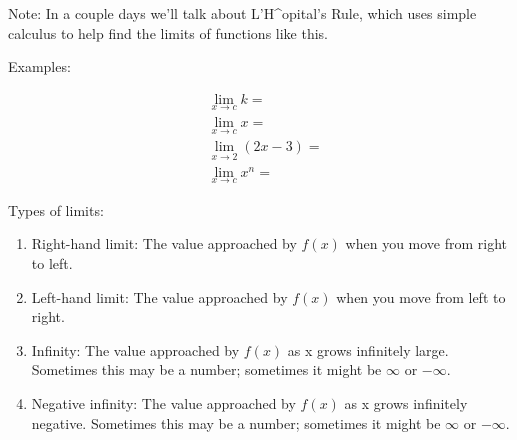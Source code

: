 \documentclass[]{book}
\providecommand{\tightlist}{%
  \setlength{\itemsep}{0pt}\setlength{\parskip}{0pt}}
\theoremstyle{definition}
\theoremstyle{definition}
\theoremstyle{definition}
\theoremstyle{remark}
\begin{document}
Note: In a couple days we'll talk about L'H\^{}opital's Rule, which uses
simple calculus to help find the limits of functions like this.

Examples:

\begin{align*}
& \lim_{x \to c} k = \\
& \lim_{x \to c} x = \\
& \lim_{x\to 2} (2x-3) =\\
& \lim_{x \to c} x^n = 
\end{align*}

Types of limits:

\begin{enumerate}
\def\labelenumi{\arabic{enumi}.}
\tightlist
\item
  Right-hand limit: The value approached by \(f(x)\) when you move from
  right to left.

\item
  Left-hand limit: The value approached by \(f(x)\) when you move from
  left to right.
\item
  Infinity: The value approached by \(f(x)\) as x grows infinitely
  large. Sometimes this may be a number; sometimes it might be
  \(\infty\) or \(-\infty\).
\item
  Negative infinity: The value approached by \(f(x)\) as x grows
  infinitely negative. Sometimes this may be a number; sometimes it
  might be \(\infty\) or \(-\infty\).
\end{enumerate}
\end{document}
